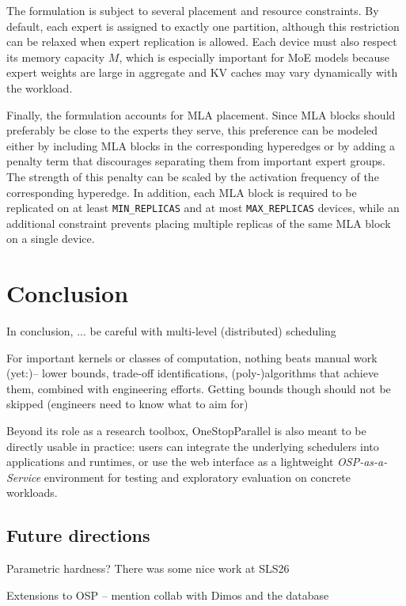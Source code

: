 \documentclass[oneside,reqno, a4paper]{amsart}
\numberwithin{equation}{section}
\let\Oldsection\section
\renewcommand{\section}{\FloatBarrier\Oldsection}
\begin{document}
The formulation is subject to several placement and resource constraints. By default, each expert is assigned to exactly one partition, although this restriction can be relaxed when expert replication is allowed. Each device must also respect its memory capacity $M$, which is especially important for MoE models because expert weights are large in aggregate and KV caches may vary dynamically with the workload.

Finally, the formulation accounts for MLA placement. Since MLA blocks should preferably be close to the experts they serve, this preference can be modeled either by including MLA blocks in the corresponding hyperedges or by adding a penalty term that discourages separating them from important expert groups. The strength of this penalty can be scaled by the activation frequency of the corresponding hyperedge. In addition, each MLA block is required to be replicated on at least \texttt{MIN\_REPLICAS} and at most \texttt{MAX\_REPLICAS} devices, while an additional constraint prevents placing multiple replicas of the same MLA block on a single device.






\section{Conclusion}

In conclusion, ...
be careful with multi-level (distributed) scheduling

For important kernels or classes of computation, nothing beats manual work (yet:)-- lower bounds, trade-off identifications, (poly-)algorithms that achieve them, combined with engineering efforts. Getting bounds though should not be skipped (engineers need to know what to aim for)

Beyond its role as a research toolbox, OneStopParallel is also meant to be directly usable in practice: users can integrate the underlying schedulers into applications and runtimes, or use the web interface as a lightweight \emph{OSP-as-a-Service} environment for testing and exploratory evaluation on concrete workloads.

\subsection{Future directions}

Parametric hardness? There was some nice work at SLS26

Extensions to OSP -- mention collab with Dimos and the database



\end{document}
